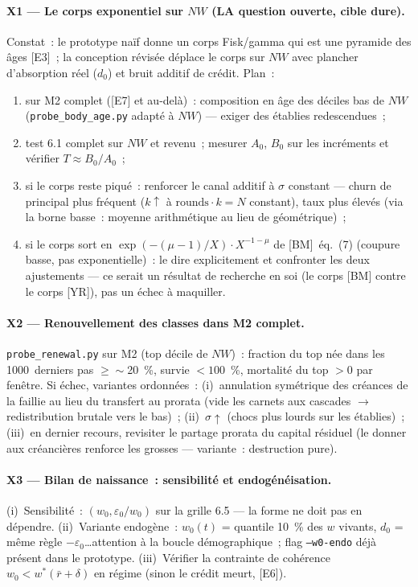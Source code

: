 \documentclass[11pt,a4paper]{article}
\newcommand{\NW}{\mathit{NW}}
\begin{document}
\paragraph{X1 --- Le corps exponentiel sur \texorpdfstring{$\NW$}{NW} (LA question ouverte, cible dure).}
Constat~: le prototype naïf donne un corps Fisk/gamma qui est une pyramide des âges [E3]~; la conception révisée déplace le corps sur $\NW$ avec plancher d'absorption réel ($d_0$) et bruit additif de crédit. Plan~:
\begin{enumerate}
  \item sur M2 complet ([E7] et au-delà)~: composition en âge des déciles bas de $\NW$ (\texttt{probe_body_age.py} adapté à $\NW$) --- exiger des établies redescendues~;
  \item test 6.1 complet sur $\NW$ et revenu~; mesurer $A_0$, $B_0$ sur les incréments et vérifier $T\approx B_0/A_0$~;
  \item si le corps reste piqué~: renforcer le canal additif à $\sigma$ constant --- churn de principal plus fréquent ($k\uparrow$ à $\text{rounds}\cdot k = N$ constant), taux plus élevés (via la borne basse~: moyenne arithmétique au lieu de géométrique)~;
  \item si le corps sort en $\exp(-(\mu-1)/X)\cdot X^{-1-\mu}$ de [BM]~éq.~(7) (coupure basse, pas exponentielle)~: le dire explicitement et confronter les deux ajustements --- ce serait un résultat de recherche en soi (le corps [BM] contre le corps [YR]), pas un échec à maquiller.
\end{enumerate}

\paragraph{X2 --- Renouvellement des classes dans M2 complet.}
\texttt{probe_renewal.py} sur M2 (top décile de $\NW$)~: fraction du top née dans les 1000~derniers pas $\geq \sim$20~\%, survie $<100$~\%, mortalité du top $>0$ par fenêtre. Si échec, variantes ordonnées~: (i)~annulation symétrique des créances de la faillie au lieu du transfert au prorata (vide les carnets aux cascades $\to$ redistribution brutale vers le bas)~; (ii)~$\sigma\uparrow$ (chocs plus lourds sur les établies)~; (iii)~en dernier recours, revisiter le partage prorata du capital résiduel (le donner aux créancières renforce les grosses --- variante~: destruction pure).

\paragraph{X3 --- Bilan de naissance~: sensibilité et endogénéisation.}
(i)~Sensibilité~: $(w_0,\varepsilon_0/w_0)$ sur la grille 6.5 --- la forme ne doit pas en dépendre. (ii)~Variante endogène~: $w_0(t)$ = quantile 10~\% des $w$ vivants, $d_0$ = même règle $- \varepsilon_0$\ldots attention à la boucle démographique~; flag \texttt{--w0-endo} déjà présent dans le prototype. (iii)~Vérifier la contrainte de cohérence $w_0<w^*(\bar r+\delta)$ en régime (sinon le crédit meurt, [E6]).
\end{document}
